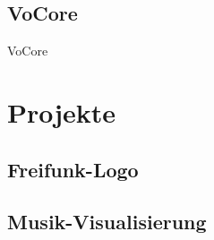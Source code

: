 \documentclass{beamer}
\begin{document}
\subsection{VoCore}
\begin{frame}{VoCore}
\end{frame}

\section{Projekte}
\subsection{Freifunk-Logo}
\begin{frame}
\end{frame}

\subsection{Musik-Visualisierung}
\begin{frame}
\end{frame}
\end{document}
